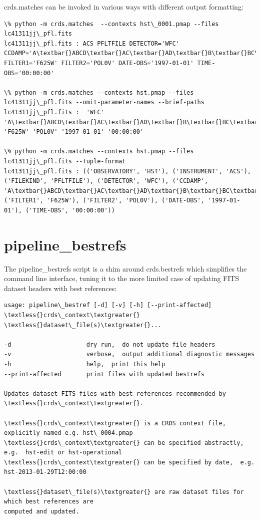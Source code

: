 \documentclass[letterpaper,10pt,english]{sphinxmanual}
\begin{document}
crds.matches can be invoked in various ways with different output formatting:

\begin{Verbatim}[commandchars=\\\{\}]
\% python -m crds.matches  --contexts hst\_0001.pmap --files lc41311jj\_pfl.fits
lc41311jj\_pfl.fits : ACS PFLTFILE DETECTOR='WFC' CCDAMP='A\textbar{}ABCD\textbar{}AC\textbar{}AD\textbar{}B\textbar{}BC\textbar{}BD\textbar{}C\textbar{}D' FILTER1='F625W' FILTER2='POL0V' DATE-OBS='1997-01-01' TIME-OBS='00:00:00'

\% python -m crds.matches --contexts hst.pmap --files lc41311jj\_pfl.fits --omit-parameter-names --brief-paths
lc41311jj\_pfl.fits :  'WFC' 'A\textbar{}ABCD\textbar{}AC\textbar{}AD\textbar{}B\textbar{}BC\textbar{}BD\textbar{}C\textbar{}D' 'F625W' 'POL0V' '1997-01-01' '00:00:00'

\% python -m crds.matches --contexts hst.pmap --files lc41311jj\_pfl.fits --tuple-format
lc41311jj\_pfl.fits : (('OBSERVATORY', 'HST'), ('INSTRUMENT', 'ACS'), ('FILEKIND', 'PFLTFILE'), ('DETECTOR', 'WFC'), ('CCDAMP', 'A\textbar{}ABCD\textbar{}AC\textbar{}AD\textbar{}B\textbar{}BC\textbar{}BD\textbar{}C\textbar{}D'), ('FILTER1', 'F625W'), ('FILTER2', 'POL0V'), ('DATE-OBS', '1997-01-01'), ('TIME-OBS', '00:00:00'))
\end{Verbatim}


\section{pipeline\_bestrefs}
\label{command_line_tools:pipeline-bestrefs}
The pipeline\_bestrefs script is a shim around crds.bestrefs which simplifies the command line interface,
tuning it to the more limited case of updating FITS dataset headers with best references:

\begin{Verbatim}[commandchars=\\\{\}]
usage: pipeline\_bestref [-d] [-v] [-h] [--print-affected] \textless{}crds\_context\textgreater{} \textless{}dataset\_file(s)\textgreater{}...

-d                     dry run,  do not update file headers
-v                     verbose,  output additional diagnostic messages
-h                     help,  print this help
--print-affected       print files with updated bestrefs

Updates dataset FITS files with best references recommended by \textless{}crds\_context\textgreater{}.

\textless{}crds\_context\textgreater{} is a CRDS context file, explicitly named e.g. hst\_0004.pmap
\textless{}crds\_context\textgreater{} can be specified abstractly,  e.g.  hst-edit or hst-operational
\textless{}crds\_context\textgreater{} can be specified by date,  e.g.  hst-2013-01-29T12:00:00

\textless{}dataset\_file(s)\textgreater{} are raw dataset files for which best references are
computed and updated.
\end{Verbatim}
\end{document}
